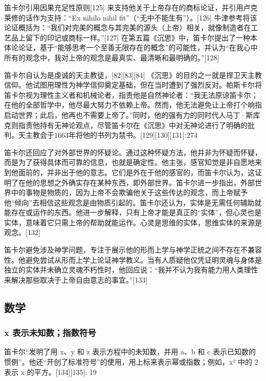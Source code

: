 笛卡尔引用因果充足性原则[125] 来支持他关于上帝存在的商标论证，并引用卢克莱修的话作为支持：“Ex nihilo nihil fit”（“无中不能生有”）。[126] 牛津参考将该论证概括为：“我们对完美的概念与其完美的源头（上帝）相关，就像制造者在工艺品上留下的印记或商标一样。”[127] 在第五篇《沉思》中，笛卡尔提出了一种本体论论证，基于“能够思考一个至善无限存在的概念”的可能性，并认为“在我心中所有的观念中，我对上帝的观念是最真实、最清晰和最明确的。”[128]

笛卡尔自认为是虔诚的天主教徒，[82][83][84] 《沉思》的目的之一就是捍卫天主教信仰。他试图用理性为神学信仰奠定基础，但在当时遭到了强烈反对。帕斯卡尔将笛卡尔视为理性主义者和机械论者，指责他是自然神论者：“我无法原谅笛卡尔；在他的全部哲学中，他尽最大努力不依赖上帝。然而，他无法避免让上帝打个响指启动世界；此后，他再也不需要上帝了。”同时，他的强有力的同时代人马丁·斯库克则指责他持有无神论观点，尽管笛卡尔在《沉思》中对无神论进行了明确的批判。天主教会于1663年将他的书列为禁书。[129][130][131]: 274

笛卡尔还回应了对外部世界的怀疑论。通过这种怀疑方法，他并非为怀疑而怀疑，而是为了获得具体而可靠的信息，也就是确定性。他主张，感官知觉是非自愿地来到他面前的，并非出于他的意志。它们是外在于他的感官的，而笛卡尔认为，这证明了在他的思想之外确实存在某种东西，即外部世界。笛卡尔进一步指出，外部世界中的事物是物质的，因为上帝不会欺骗他关于这些传达的观念，而上帝赋予他“倾向”去相信这些观念是由物质引起的。笛卡尔还认为，实体是无需任何辅助就能存在或运作的东西。他进一步解释，只有上帝才能是真正的“实体”，但心灵也是实体，意味着它只需上帝的帮助就能运作。心灵是思维的实体，思维实体的来源是观念。[132]

笛卡尔避免涉及神学问题，专注于展示他的形而上学与神学正统之间不存在不兼容性。他避免尝试从形而上学上论证神学教义。当有人质疑他仅凭证明灵魂与身体是独立的实体并未确立灵魂不朽性时，他回应说：“我并不认为我有能力用人类理性来解决那些取决于上帝自由意志的事宜。”[133]
\subsection{数学}
\subsubsection{x 表示未知数；指数符号}
笛卡尔“发明了用 x、y 和 z 表示方程中的未知数，并用 a、b 和 c 表示已知数的惯例”。他还“开创了标准符号”的使用，用上标来表示幂或指数；例如，x² 中的 2 表示 x 的平方。[134][135]: 19
